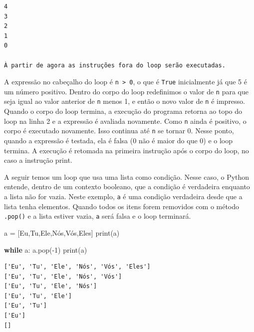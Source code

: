 \documentclass[
  brazilian,
  letterpaper,
  DIV=11,
  numbers=noendperiod]{scrreprt}
\newenvironment{Shaded}{\begin{snugshade}}{\end{snugshade}}
\newcommand{\BuiltInTok}[1]{\textcolor[rgb]{0.00,0.23,0.31}{#1}}
\newcommand{\ControlFlowTok}[1]{\textcolor[rgb]{0.00,0.23,0.31}{\textbf{#1}}}
\newcommand{\DecValTok}[1]{\textcolor[rgb]{0.68,0.00,0.00}{#1}}
\newcommand{\NormalTok}[1]{\textcolor[rgb]{0.00,0.23,0.31}{#1}}
\newcommand{\OperatorTok}[1]{\textcolor[rgb]{0.37,0.37,0.37}{#1}}
\newcommand{\StringTok}[1]{\textcolor[rgb]{0.13,0.47,0.30}{#1}}
\begin{document}
\begin{verbatim}
4
3
2
1
0

À partir de agora as instruções fora do loop serão executadas.
\end{verbatim}

A expressão no cabeçalho do loop é \texttt{n\ \textgreater{}\ 0}, o que
é \texttt{True} inicialmente já que 5 é um número positivo. Dentro do
corpo do loop redefinimos o valor de \texttt{n} para que seja igual ao
valor anterior de \texttt{n} menos 1, e então o novo valor de \texttt{n}
é impresso. Quando o corpo do loop termina, a execução do programa
retorna ao topo do loop na linha 2 e a expressão é avaliada novamente.
Como \texttt{n} ainda é positivo, o corpo é executado novamente. Isso
continua até \texttt{n} se tornar 0. Nesse ponto, quando a expressão é
testada, ela é falsa (0 não é maior do que 0) e o loop termina. A
execução é retomada na primeira instrução após o corpo do loop, no caso
a instrução print.

A seguir temos um loop que usa uma lista como condição. Nesse caso, o
Python entende, dentro de um contexto booleano, que a condição é
verdadeira enquanto a lista não for vazia. Neste exemplo, \texttt{a} é
uma condição verdadeira desde que a lista tenha elementos. Quando todos
os itens forem removidos com o método \texttt{.pop()} e a lista estiver
vazia, \texttt{a} será falsa e o loop terminará.

\begin{Shaded}
\begin{Highlighting}[]
\NormalTok{a }\OperatorTok{=}\NormalTok{ [}\StringTok{\textquotesingle{}Eu\textquotesingle{}}\NormalTok{,}\StringTok{\textquotesingle{}Tu\textquotesingle{}}\NormalTok{,}\StringTok{\textquotesingle{}Ele\textquotesingle{}}\NormalTok{,}\StringTok{\textquotesingle{}Nós\textquotesingle{}}\NormalTok{,}\StringTok{\textquotesingle{}Vós\textquotesingle{}}\NormalTok{,}\StringTok{\textquotesingle{}Eles\textquotesingle{}}\NormalTok{]}
\BuiltInTok{print}\NormalTok{(a)}

\ControlFlowTok{while}\NormalTok{ a:}
\NormalTok{    a.pop(}\OperatorTok{{-}}\DecValTok{1}\NormalTok{)}
    \BuiltInTok{print}\NormalTok{(a)}
\end{Highlighting}
\end{Shaded}

\begin{verbatim}
['Eu', 'Tu', 'Ele', 'Nós', 'Vós', 'Eles']
['Eu', 'Tu', 'Ele', 'Nós', 'Vós']
['Eu', 'Tu', 'Ele', 'Nós']
['Eu', 'Tu', 'Ele']
['Eu', 'Tu']
['Eu']
[]
\end{verbatim}
\end{document}
